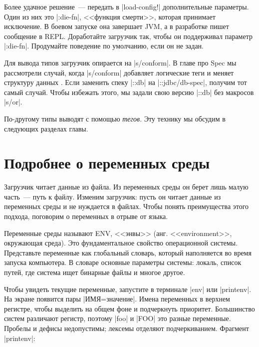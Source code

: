 
Более удачное решение~--- передать в \spverb|load-config!| дополнительные
параметры. Один из них это \spverb|:die-fn|, <<функция смерти>>, которая
принимает исключение. В боевом запуске она завершает JVM, а в разработке пишет
сообщение в REPL. Доработайте загрузчик так, чтобы он поддерживал параметр
\spverb|:die-fn|. Продумайте поведение по умолчанию, если он не задан.

Для вывода типов загрузчик опирается на \spverb|s/conform|. В главе про Spec мы
рассмотрели случай, когда \spverb|s/conform| добавляет логические теги и меняет
структуру данных . Если заменить спеку \spverb|::db|
на \spverb|::jdbc/db-spec|, получим тот самый случай. Чтобы избежать этого, мы
задали свою версию \spverb|::db| без макросов \spverb|s/or|.


По-другому типы выводят с помощью \emph{тегов}. Эту технику мы обсудим в
следующих разделах главы.

\section{Подробнее о переменных среды}


Загрузчик читает данные из файла. Из переменных среды он берет лишь малую
часть~--- путь к файлу. Изменим загрузчик: пусть он читает данные из переменных
среды и не нуждается в файлах. Чтобы понять преимущества этого подхода,
поговорим о переменных в отрыве от языка.

Переменные среды называют ENV, <<энвы>> (анг. <<environment>>, окружающая
среда). Это фундаментальное свойство операционной системы. Представьте
переменные как глобальный словарь, который наполняется во время запуска
компьютера. В словаре основные параметры системы: локаль, список путей, где
система ищет бинарные файлы и многое другое.


Чтобы увидеть текущие переменные, запустите в терминале \spverb|env| или
\spverb|printenv|. На экране появится пары \spverb|ИМЯ=значение|. Имена
переменных в верхнем регистре, чтобы выделить на общем фоне и подчеркнуть
приоритет. Большинство систем различают регистр, поэтому \spverb|foo| и
\spverb|FOO| это разные переменные. Пробелы и дефисы недопустимы; лексемы
отделяют подчеркиванием. Фрагмент \spverb|printenv|:


